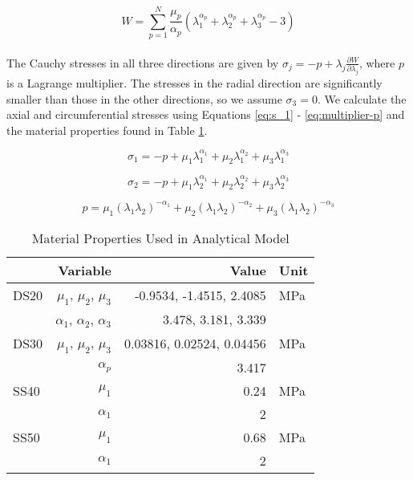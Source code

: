 \begin{equation}
    W=\sum_{p=1}^N \frac{\mu_p}{\alpha_p}(\lambda_1^{\alpha_p}+\lambda_2^{\alpha_p}+\lambda_3^{\alpha_p}-3)
    \label{eq:strain-ogden}
\end{equation}
\\
The Cauchy stresses in all three directions are given by $\sigma_j=-p+\lambda_j\frac{\partial W}{\partial\lambda_j}$, where $p$ is a Lagrange multiplier. The stresses in the radial direction are significantly smaller than those in the other directions, so we assume $\sigma_3=0$. We calculate the axial and circumferential stresses using Equations \ref{eq:s_1} - \ref{eq:multiplier-p} and the material properties found in Table \ref{table}. 

\begin{equation}
    \sigma_1 =-p+\mu_1\lambda_1^{\alpha_1}+\mu_2\lambda_1^{\alpha_2}+\mu_3\lambda_1^{\alpha_3}
    \label{eq:s_1}
\end{equation}

\begin{equation}
    \sigma_2 =-p+\mu_1\lambda_2^{\alpha_1}+\mu_2\lambda_2^{\alpha_2}+\mu_3\lambda_2^{\alpha_3}
    \label{eq:s_2}
\end{equation}

\begin{equation}
    p=\mu_1(\lambda_1\lambda_2)^{-\alpha_1}+\mu_2(\lambda_1\lambda_2)^{-\alpha_2}+\mu_3(\lambda_1\lambda_2)^{-\alpha_3}
    \label{eq:multiplier-p}
\end{equation}

\begin{table}[h!]
\caption{Material Properties Used in Analytical Model}
\label{table}
\centering
\begin{tabular}{l r r l}
\hline
{} & \bfseries Variable & \bfseries Value & \bfseries Unit \\
\hline\hline
DS20 \cite{marechal_toward_2021} & $\mu_1$, $\mu_2$, $\mu_3$ & -0.9534, -1.4515, 2.4085 & MPa\\
{} & $\alpha_1$, $\alpha_2$, $\alpha_3$ & 3.478, 3.181, 3.339 & {}\\
\hline
DS30 \cite{marechal_toward_2021} & $\mu_1$, $\mu_2$, $\mu_3$ & 0.03816, 0.02524, 0.04456 & MPa\\
{} & $\alpha_p$ & 3.417 & {}\\
\hline
SS40 \cite{pagoli_review_2022} & $\mu_1$ & 0.24 & MPa\\
{} & $\alpha_1$ & 2 & {}\\
\hline
SS50 \cite{xavier_finite_2021} & $\mu_1$ & 0.68 & MPa\\
{} & $\alpha_1$ & 2 & {}\\
\end{tabular}
\label{table}
\end{table}

